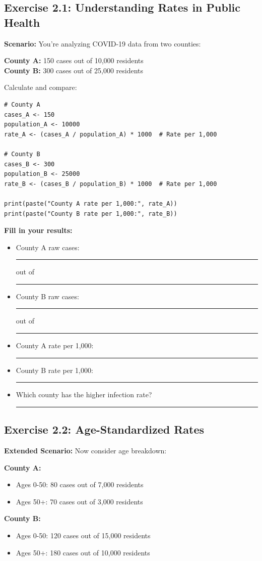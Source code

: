 \documentclass[11pt]{article}
\begin{document}
\subsection{Exercise 2.1: Understanding Rates in Public Health}

\textbf{Scenario:} You're analyzing COVID-19 data from two counties:

\textbf{County A:} 150 cases out of 10,000 residents\\
\textbf{County B:} 300 cases out of 25,000 residents

Calculate and compare:

\begin{lstlisting}
# County A
cases_A <- 150
population_A <- 10000
rate_A <- (cases_A / population_A) * 1000  # Rate per 1,000

# County B
cases_B <- 300
population_B <- 25000
rate_B <- (cases_B / population_B) * 1000  # Rate per 1,000

print(paste("County A rate per 1,000:", rate_A))
print(paste("County B rate per 1,000:", rate_B))
\end{lstlisting}

\textbf{Fill in your results:}
\begin{itemize}
\item County A raw cases: \rule{2cm}{0.4pt} out of \rule{2cm}{0.4pt}
\item County B raw cases: \rule{2cm}{0.4pt} out of \rule{2cm}{0.4pt}
\item County A rate per 1,000: \rule{2cm}{0.4pt}
\item County B rate per 1,000: \rule{2cm}{0.4pt}
\item Which county has the higher infection rate? \rule{3cm}{0.4pt}
\end{itemize}

\subsection{Exercise 2.2: Age-Standardized Rates}

\textbf{Extended Scenario:} Now consider age breakdown:

\textbf{County A:}
\begin{itemize}
\item Ages 0-50: 80 cases out of 7,000 residents
\item Ages 50+: 70 cases out of 3,000 residents
\end{itemize}

\textbf{County B:}
\begin{itemize}
\item Ages 0-50: 120 cases out of 15,000 residents
\item Ages 50+: 180 cases out of 10,000 residents
\end{itemize}
\end{document}
